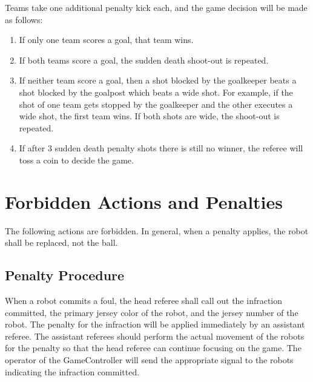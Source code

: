 \documentclass[12pt]{article}
\newcommand{\ie}{\mbox{i.\,e.}\xspace}
\newcommand{\PenaltyKickTime}{30 seconds\xspace}
\begin{document}
Teams take one additional penalty kick each, and the game decision will be made as follows:
\begin{enumerate}
  \item If only one team scores a goal, that team wins.
  \item If both teams score a goal, the sudden death shoot-out is repeated.
  \item If neither team score a goal, then a shot blocked by the goalkeeper beats a shot blocked by the goalpost which beats a wide shot. For example, if the shot of one team gets stopped by the goalkeeper and the other executes a wide shot, the first team wins. If both shots are wide, the shoot-out is repeated.
  \item If after 3 sudden death penalty shots there is still no winner, the referee will toss a coin to decide the game.
\end{enumerate}


\newpage


\section{Forbidden Actions and Penalties}
\label{sec:forbidden_act}

The following actions are forbidden. In general, when a penalty applies, the robot shall be replaced, not the ball.

\subsection{Penalty Procedure}
\label{sec:penalty_procedure}

When a robot commits a foul, the head referee shall call out the infraction committed, the primary jersey color of the robot, and the jersey number of the robot. The penalty for the infraction will be applied immediately by an assistant referee. The assistant referees should perform the actual movement of the robots for the penalty so that the head referee can continue focusing on the game. The operator of the GameController will send the appropriate signal to the robots indicating the infraction committed.
\end{document}
